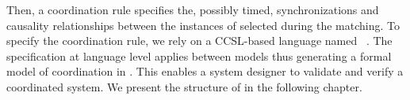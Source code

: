 Then, a coordination rule specifies the, possibly timed, synchronizations and causality relationships between the instances of \dse selected during the matching. To specify the coordination rule, we rely on a CCSL-based language named \moccml~\cite{moccmlbib}. The specification at language level applies between models thus generating a formal model of coordination in \ccsl. This enables a system designer to validate and verify a coordinated system. We present the structure of \bcool in the following chapter.
